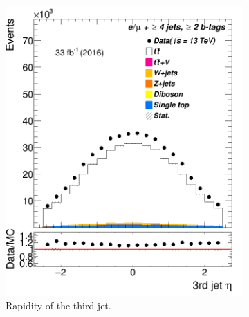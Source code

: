 \begin{figure}
	\begin{subfigure}{0.25\textwidth}
		\includegraphics[width=\linewidth]{ControlPlots_emujets_2016_4incl_2incl/jet2_eta_emujets_2016.png}
		\caption{Rapidity of the third jet.} \label{fig:e3}
	\end{subfigure}\hspace*{1.0cm}
	\begin{subfigure}{0.25\textwidth}

\end{subfigure}
\end{figure}

